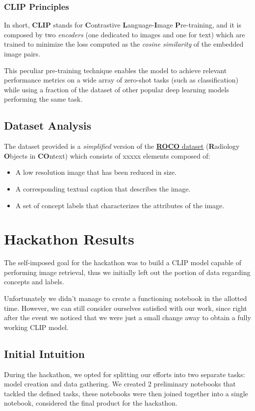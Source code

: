 \documentclass[12pt, a4paper]{article}
\begin{document}
\subsubsection*{CLIP Principles}
In short, \textbf{CLIP} stands for \textbf{C}ontrastive \textbf{L}anguage-\textbf{I}mage \textbf{P}re-training, and it is composed by two \textit{encoders} (one dedicated to images and one for text) which are trained to minimize the loss computed as the \textit{cosine similarity} of the embedded image pairs.

This peculiar pre-training technique enables the model to achieve relevant performance metrics on a wide array of zero-shot tasks (such as classification) while using a fraction of the dataset of other popular deep learning models performing the same task.

\subsection{Dataset Analysis}
The dataset provided is a \textit{simplified} version of the \href{https://link.springer.com/chapter/10.1007/978-3-030-01364-6_20}{\textbf{ROCO} dataset} (\textbf{R}adiology \textbf{O}bjects in \textbf{CO}ntext) which consists of xxxxx elements composed of:
\begin{itemize}
    \item A low resolution image that has been reduced in size.
    \item A corresponding textual caption that describes the image.
    \item A set of concept labels that characterizes the attributes of the image.
\end{itemize}


\section{Hackathon Results}
The self-imposed goal for the hackathon was to build a CLIP model capable of performing image retrieval, thus we initially left out the portion of data regarding concepts and labels.

Unfortunately we didn't manage to create a functioning notebook in the allotted time.
However, we can still consider ourselves satisfied with our work, since right after the event we noticed that we were just a small change away to obtain a fully working CLIP model.

\subsection{Initial Intuition}
During the hackathon, we opted for splitting our efforts into two separate tasks: model creation and data gathering.
We created 2 preliminary notebooks that tackled the defined tasks, these notebooks were then joined together into a single notebook, considered the final product for the hackathon.
\end{document}
